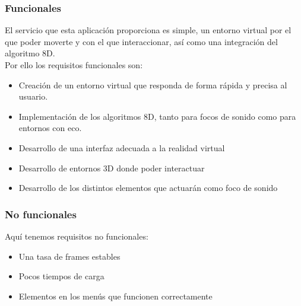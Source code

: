 \subsubsection{Funcionales}

\quad El servicio que esta aplicación proporciona es simple, un entorno virtual por el que poder moverte y con el que interaccionar, así como una integración del algoritmo 8D.\\

\quad Por ello los requisitos funcionales son:
\begin{itemize}
	\item Creación de un entorno virtual que responda de forma rápida y precisa al usuario.
	\item Implementación de los algoritmos 8D, tanto para focos de sonido como para entornos con eco.
	\item Desarrollo de una interfaz adecuada a la realidad virtual
	\item Desarrollo de entornos 3D donde poder interactuar
	\item Desarrollo de los distintos elementos que actuarán como foco de sonido
\end{itemize}


\subsubsection{No funcionales}

\quad Aquí tenemos requisitos no funcionales:
\begin{itemize}
	\item Una tasa de frames estables
	\item Pocos tiempos de carga
	\item Elementos en los menús que funcionen correctamente
\end{itemize}

\newpage


